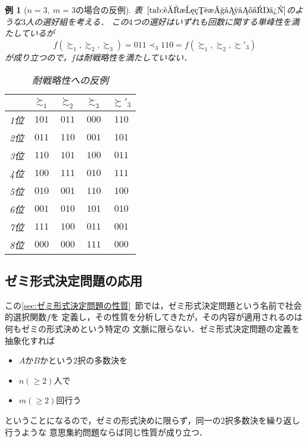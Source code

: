 \documentclass[dvipdfmx]{jsarticle}
\newtheorem{example}{例}[section]
\begin{document}
  \begin{example}[$n=3,\ m=3$の場合の反例]
    表~$\ref{tab:耐戦略性への反例}$のような$3$人の選好組を考える．
    この$4$つの選好はいずれも回数に関する単峰性を満たしているが
    \begin{equation*}
      f(\succsim_1, \succsim_2, \succsim_3) = 011
      \prec_3
      110 = f(\succsim_1, \succsim_2, \succsim'_3) 
    \end{equation*}
    が成り立つので，$f$は耐戦略性を満たしていない．
    \begin{table}[h]
      \caption{耐戦略性への反例}\label{tab:耐戦略性への反例}
      \begin{center}
        \begin{tabular}{c|c|c|c|c}\hline
            & $\succsim_1$ & $\succsim_2$ & $\succsim_3$ & $\succsim'_3$\\ \hline
          1位 & $101$ & $011$ & $000$ & $110$ \\
          2位 & $011$ & $110$ & $001$ & $101$ \\
          3位 & $110$ & $101$ & $100$ & $011$ \\
          4位 & $100$ & $111$ & $010$ & $111$ \\
          5位 & $010$ & $001$ & $110$ & $100$ \\
          6位 & $001$ & $010$ & $101$ & $010$ \\
          7位 & $111$ & $100$ & $011$ & $001$ \\
          8位 & $000$ & $000$ & $111$ & $000$ \\ \hline
        \end{tabular}
      \end{center}
    \end{table}
  \end{example}


\subsection{ゼミ形式決定問題の応用}\label{subsec:ゼミ形式決定問題の応用}
  この\ref{sec:ゼミ形式決定問題の性質}~節では，ゼミ形式決定問題という名前で社会的選択関数$f$を
  定義し，その性質を分析してきたが，その内容が適用されるのは何もゼミの形式決めという特定の
  文脈に限らない．ゼミ形式決定問題の定義を抽象化すれば
  \begin{itemize}
    \item $A$か$B$かという$2$択の多数決を
    \item $n(\geq 2)$人で
    \item $m(\geq 2)$回行う
  \end{itemize}
  ということになるので，ゼミの形式決めに限らず，同一の2択多数決を繰り返し行うような
  意思集約問題ならば同じ性質が成り立つ．
\end{document}
